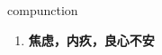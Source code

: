 
\begin{frame}
{\huge compunction}
\begin{center}
\begin{enumerate}\Large
  \item \textbf{焦虑，内疚，良心不安}
\end{enumerate}
\end{center}
\end{frame}
